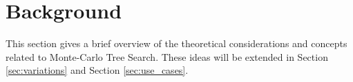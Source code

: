 \section{Background}
\label{sec:background}
This section gives a brief overview of the theoretical considerations and concepts related to Monte-Carlo Tree Search. These ideas will be extended in Section \ref{sec:variations} and Section \ref{sec:use_cases}.

